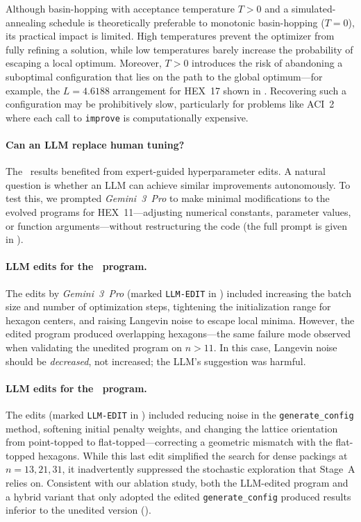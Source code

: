 \documentclass[sigconf]{acmart}
\begin{document}
Although basin-hopping with acceptance temperature $T > 0$ and a simulated-annealing schedule is theoretically preferable to monotonic basin-hopping ($T = 0$), its practical impact is limited. High temperatures prevent the optimizer from fully refining a solution, while low temperatures barely increase the probability of escaping a local optimum. Moreover, $T > 0$ introduces the risk of abandoning a suboptimal configuration that lies on the path to the global optimum---for example, the $L = 4.6188$ arrangement for HEX~17 shown in . Recovering such a configuration may be prohibitively slow, particularly for problems like ACI~2 where each call to \texttt{improve} is computationally expensive.

\paragraph{Can an LLM replace human tuning?}
The \improvevolvepluse\ results benefited from expert-guided hyperparameter edits. A natural question is whether an LLM can achieve similar improvements autonomously. To test this, we prompted \emph{Gemini~3~Pro} to make minimal modifications to the evolved programs for HEX~11---adjusting numerical constants, parameter values, or function arguments---without restructuring the code (the full prompt is given in ).

\paragraph{LLM edits for the \gigaevo\ program.}
The edits by \emph{Gemini~3~Pro} (marked \texttt{LLM-EDIT} in ) included increasing the batch size and number of optimization steps, tightening the initialization range for hexagon centers, and raising Langevin noise to escape local minima. However, the edited program produced overlapping hexagons---the same failure mode observed when validating the unedited program on $n > 11$. In this case, Langevin noise should be \emph{decreased}, not increased; the LLM's suggestion was harmful.

\paragraph{LLM edits for the \improvevolve\ program.}
The edits (marked \texttt{LLM-EDIT} in ) included reducing noise in the \texttt{generate\allowbreak\_config} method, softening initial penalty weights, and changing the lattice orientation from point-topped to flat-topped---correcting a geometric mismatch with the flat-topped hexagons.
While this last edit simplified the search for dense packings at $n = 13, 21, 31$, it inadvertently suppressed the stochastic exploration that Stage~A relies on.
Consistent with our ablation study, both the LLM-edited program and a hybrid variant that only adopted the edited \texttt{generate\allowbreak\_config} produced results inferior to the unedited version ().
\end{document}
